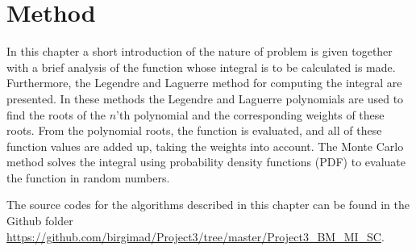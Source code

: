 \chapter{Method}
\label{chap:method} 
In this chapter a short introduction of the nature of problem is given together with a brief analysis of the function whose integral is to be calculated is made. 
Furthermore, the Legendre and Laguerre method for computing the integral are presented. In these methods the Legendre and Laguerre polynomials are used to find the roots of the $n$'th polynomial and the corresponding weights of these roots. 
From the polynomial roots, the function is evaluated, and all of these function values are added up, taking the weights into account. 
The Monte Carlo method solves the integral using probability density functions (PDF) to evaluate the function in random numbers.

The source codes for the algorithms described in this chapter can be found in the Github folder \url{https://github.com/birgimad/Project3/tree/master/Project3_BM_MI_SC}. 
